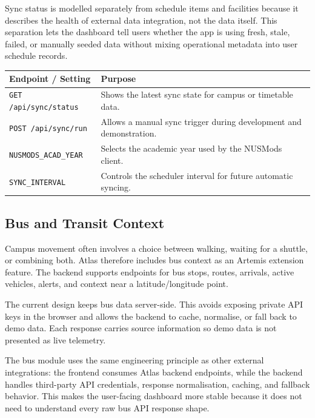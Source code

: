 \documentclass[11pt]{article}
\begin{document}
Sync status is modelled separately from schedule items and facilities because it describes the health of external data integration, not the data itself. This separation lets the dashboard tell users whether the app is using fresh, stale, failed, or manually seeded data without mixing operational metadata into user schedule records.

\begin{center}
\renewcommand{\arraystretch}{1.35}
\begin{tabularx}{\textwidth}{|L{0.28\textwidth}|X|}
\hline
\textbf{Endpoint / Setting} & \textbf{Purpose} \\
\hline
\texttt{GET /api/sync/status} & Shows the latest sync state for campus or timetable data. \\
\hline
\texttt{POST /api/sync/run} & Allows a manual sync trigger during development and demonstration. \\
\hline
\texttt{NUSMODS\_ACAD\_YEAR} & Selects the academic year used by the NUSMods client. \\
\hline
\texttt{SYNC\_INTERVAL} & Controls the scheduler interval for future automatic syncing. \\
\hline
\end{tabularx}
\end{center}

\subsection*{Bus and Transit Context}

Campus movement often involves a choice between walking, waiting for a shuttle, or combining both. Atlas therefore includes bus context as an Artemis extension feature. The backend supports endpoints for bus stops, routes, arrivals, active vehicles, alerts, and context near a latitude/longitude point.

The current design keeps bus data server-side. This avoids exposing private API keys in the browser and allows the backend to cache, normalise, or fall back to demo data. Each response carries source information so demo data is not presented as live telemetry.

The bus module uses the same engineering principle as other external integrations: the frontend consumes Atlas backend endpoints, while the backend handles third-party API credentials, response normalisation, caching, and fallback behavior. This makes the user-facing dashboard more stable because it does not need to understand every raw bus API response shape.
\end{document}

